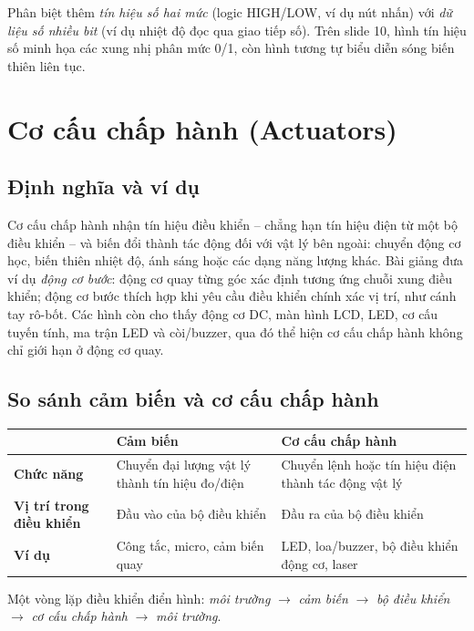 Phân biệt thêm \emph{tín hiệu số hai mức} (logic HIGH/LOW, ví dụ nút nhấn) với \emph{dữ liệu số nhiều bit} (ví dụ nhiệt độ đọc qua giao tiếp số). Trên slide 10, hình tín hiệu số minh họa các xung nhị phân mức 0/1, còn hình tương tự biểu diễn sóng biến thiên liên tục.
\section{Cơ cấu chấp hành (Actuators)}
\subsection{Định nghĩa và ví dụ}
Cơ cấu chấp hành nhận tín hiệu điều khiển -- chẳng hạn tín hiệu điện từ một bộ điều khiển -- và biến đổi thành tác động đối với vật lý bên ngoài: chuyển động cơ học, biến thiên nhiệt độ, ánh sáng hoặc các dạng năng lượng khác. Bài giảng đưa ví dụ \emph{động cơ bước}: động cơ quay từng góc xác định tương ứng chuỗi xung điều khiển; động cơ bước thích hợp khi yêu cầu điều khiển chính xác vị trí, như cánh tay rô-bốt. Các hình còn cho thấy động cơ DC, màn hình LCD, LED, cơ cấu tuyến tính, ma trận LED và còi/buzzer, qua đó thể hiện cơ cấu chấp hành không chỉ giới hạn ở động cơ quay.
\subsection{So sánh cảm biến và cơ cấu chấp hành}
\begin{center}\begin{tabularx}{\linewidth}{>{\bfseries}p{.22\linewidth}XX}\toprule & Cảm biến & Cơ cấu chấp hành\\\midrule
Chức năng & Chuyển đại lượng vật lý thành tín hiệu đo/điện & Chuyển lệnh hoặc tín hiệu điện thành tác động vật lý\\
Vị trí trong điều khiển & Đầu vào của bộ điều khiển & Đầu ra của bộ điều khiển\\
Ví dụ & Công tắc, micro, cảm biến quay & LED, loa/buzzer, bộ điều khiển động cơ, laser\\\bottomrule\end{tabularx}\end{center}
Một vòng lặp điều khiển điển hình: \emph{môi trường} \(\rightarrow\) \emph{cảm biến} \(\rightarrow\) \emph{bộ điều khiển} \(\rightarrow\) \emph{cơ cấu chấp hành} \(\rightarrow\) \emph{môi trường}.
